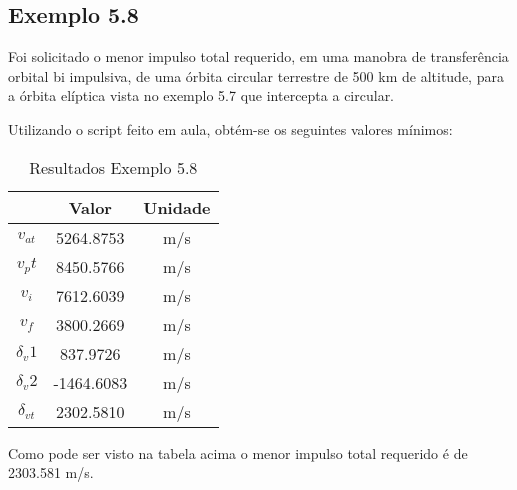 \subsection{Exemplo 5.8}

Foi solicitado o menor impulso total requerido, em uma manobra de transferência orbital bi impulsiva, de uma órbita circular terrestre de 500 km de altitude, para a órbita elíptica vista no exemplo 5.7 que intercepta a circular.
\par Utilizando o script feito em aula, obtém-se os seguintes valores mínimos:

\begin{table}[h]
\centering
\caption{Resultados Exemplo 5.8}
\label{ex58}

\begin{tabular}{|c|c|c|}
\hline
                              & Valor      & Unidade \\ \hline
$v_{at}$                         & 5264.8753  & m/s     \\ \hline
$v_pt$                         & 8450.5766  & m/s     \\ \hline
$v_i$                          & 7612.6039  & m/s     \\ \hline
$v_f$                          & 3800.2669  & m/s     \\ \hline
$\delta_v1 $    & 837.9726   & m/s     \\ \hline
$\delta_v2 $    & -1464.6083 & m/s     \\ \hline
$\delta_{vt}$ & 2302.5810  & m/s     \\ \hline
\end{tabular}

\end{table}

\par Como pode ser visto na tabela acima o menor impulso total requerido é de 2303.581 m/s. 